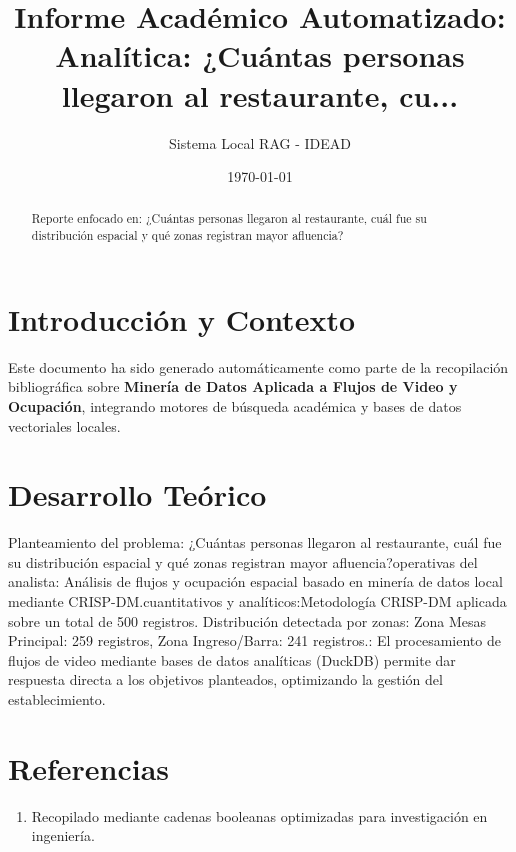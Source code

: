 \documentclass[12pt,a4paper]{article}
\title{\textbf{Informe Académico Automatizado: Analítica: ¿Cuántas personas llegaron al restaurante, cu...}}
\author{Sistema Local RAG - IDEAD}
\date{\today}
\begin{document}
\maketitle

\begin{abstract}
Reporte enfocado en: ¿Cuántas personas llegaron al restaurante, cuál fue su distribución espacial y qué zonas registran mayor afluencia?
\end{abstract}

\section{Introducción y Contexto}
Este documento ha sido generado automáticamente como parte de la recopilación bibliográfica sobre \textbf{Minería de Datos Aplicada a Flujos de Video y Ocupación}, integrando motores de búsqueda académica y bases de datos vectoriales locales.

\section{Desarrollo Teórico}
Planteamiento del problema: ¿Cuántas personas llegaron al restaurante, cuál fue su distribución espacial y qué zonas registran mayor afluencia?\newline\newlineNotas operativas del analista: Análisis de flujos y ocupación espacial basado en minería de datos local mediante CRISP-DM.\newline\newlineResultados cuantitativos y analíticos:\newline Metodología CRISP-DM aplicada sobre un total de 500 registros. Distribución detectada por zonas: Zona Mesas Principal: 259 registros, Zona Ingreso/Barra: 241 registros.\newline\newlineConclusiones: El procesamiento de flujos de video mediante bases de datos analíticas (DuckDB) permite dar respuesta directa a los objetivos planteados, optimizando la gestión del establecimiento.

\section{Referencias}
\begin{enumerate}
    \item Recopilado mediante cadenas booleanas optimizadas para investigación en ingeniería.
\end{enumerate}
\end{document}
